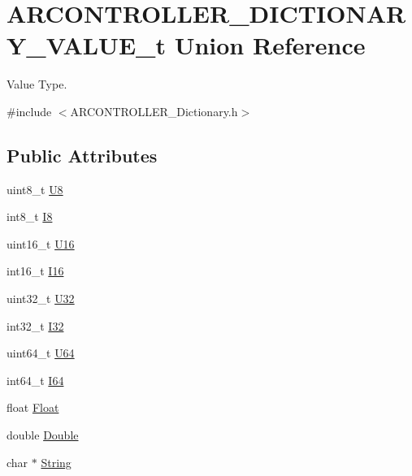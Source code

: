 \hypertarget{union_a_r_c_o_n_t_r_o_l_l_e_r___d_i_c_t_i_o_n_a_r_y___v_a_l_u_e__t}{}\section{A\+R\+C\+O\+N\+T\+R\+O\+L\+L\+E\+R\+\_\+\+D\+I\+C\+T\+I\+O\+N\+A\+R\+Y\+\_\+\+V\+A\+L\+U\+E\+\_\+t Union Reference}
\label{union_a_r_c_o_n_t_r_o_l_l_e_r___d_i_c_t_i_o_n_a_r_y___v_a_l_u_e__t}


Value Type.  




{\ttfamily \#include $<$A\+R\+C\+O\+N\+T\+R\+O\+L\+L\+E\+R\+\_\+\+Dictionary.\+h$>$}

\subsection*{Public Attributes}
\begin{DoxyCompactItemize}
\item 
uint8\+\_\+t \hyperlink{union_a_r_c_o_n_t_r_o_l_l_e_r___d_i_c_t_i_o_n_a_r_y___v_a_l_u_e__t_a77837ca6f700e7ef779102bd8043e6ab}{U8}
\item 
int8\+\_\+t \hyperlink{union_a_r_c_o_n_t_r_o_l_l_e_r___d_i_c_t_i_o_n_a_r_y___v_a_l_u_e__t_ac3c52ffbbf8e91d70351fd9672358b5f}{I8}
\item 
uint16\+\_\+t \hyperlink{union_a_r_c_o_n_t_r_o_l_l_e_r___d_i_c_t_i_o_n_a_r_y___v_a_l_u_e__t_afae3e146b19241e476d0c65461f7eca2}{U16}
\item 
int16\+\_\+t \hyperlink{union_a_r_c_o_n_t_r_o_l_l_e_r___d_i_c_t_i_o_n_a_r_y___v_a_l_u_e__t_aa643fa6de258da0644523c28f64bc0e8}{I16}
\item 
uint32\+\_\+t \hyperlink{union_a_r_c_o_n_t_r_o_l_l_e_r___d_i_c_t_i_o_n_a_r_y___v_a_l_u_e__t_ab53af0399dd371f5f10608c3cb03a7c0}{U32}
\item 
int32\+\_\+t \hyperlink{union_a_r_c_o_n_t_r_o_l_l_e_r___d_i_c_t_i_o_n_a_r_y___v_a_l_u_e__t_a3bb837d9868fbbc8178b712e18d64336}{I32}
\item 
uint64\+\_\+t \hyperlink{union_a_r_c_o_n_t_r_o_l_l_e_r___d_i_c_t_i_o_n_a_r_y___v_a_l_u_e__t_a74c8a14f0e2f84f08721b85a99090144}{U64}
\item 
int64\+\_\+t \hyperlink{union_a_r_c_o_n_t_r_o_l_l_e_r___d_i_c_t_i_o_n_a_r_y___v_a_l_u_e__t_a873094686e25d207d483f1186b4797fe}{I64}
\item 
float \hyperlink{union_a_r_c_o_n_t_r_o_l_l_e_r___d_i_c_t_i_o_n_a_r_y___v_a_l_u_e__t_a37b2d4b1afa27e2bd2bb7636c534a8d2}{Float}
\item 
double \hyperlink{union_a_r_c_o_n_t_r_o_l_l_e_r___d_i_c_t_i_o_n_a_r_y___v_a_l_u_e__t_a5bbcf77432a885708afa2b680f891e2b}{Double}
\item 
char $\ast$ \hyperlink{union_a_r_c_o_n_t_r_o_l_l_e_r___d_i_c_t_i_o_n_a_r_y___v_a_l_u_e__t_aa56723dd7a707d83cc29a27fbcd04127}{String}
\end{DoxyCompactItemize}


